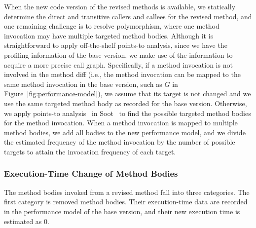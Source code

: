 When the new code version of the revised methods is available, we  
statically determine the direct and transitive callers and callees for the revised method, and one remaining challenge is to resolve polymorphism, where one method invocation may have multiple targeted method bodies. Although it is straightforward to apply off-the-shelf points-to analysis, since we have the profiling information of the base version, we make use of the information to acquire a more precise call graph. Specifically, if a method invocation is not involved in the method diff (i.e., the method invocation can be mapped to the same method invocation in the base version, such as $G$ in Figure~\ref{fig:performance-model}), we assume that its target is not changed and we use the same targeted method body as recorded for the base version. Otherwise, we apply points-to analysis~\cite{Spark} in Soot~\cite{Soot} to find the possible targeted method bodies for the method invocation. When a method invocation is mapped to multiple method bodies, we add all bodies to the new performance model, and we divide the estimated frequency of the method invocation by the number of possible targets to attain the invocation frequency of each target. 








\subsubsection{Execution-Time Change of Method Bodies}
\label{subsub:findExetime}

The method bodies invoked from a revised method fall into three  categories. The first category is removed method bodies. Their execution-time data are recorded in the performance model of the base version, and their new execution time is estimated as 0.

